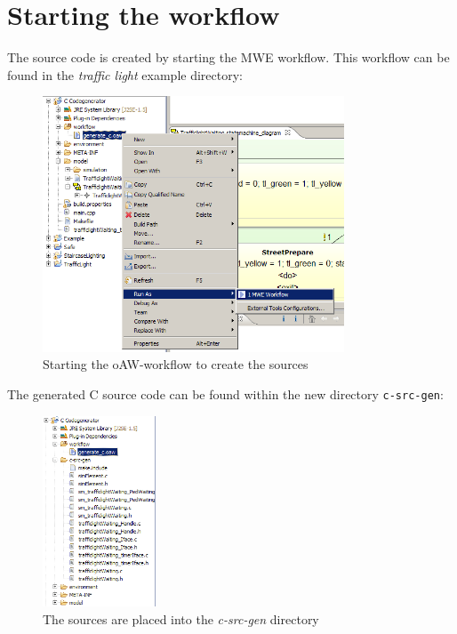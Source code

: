 
\section{Starting the workflow}

The source code is created by starting the MWE workflow. This workflow can be
found in the \textit{traffic light} example directory:

\begin{figure}[h!] \center
\includegraphics[width=0.8\textwidth]{./Pictures/workflow}
\caption{\label{fig:workflow}Starting the oAW-workflow to create the sources}
\end{figure}
\newpage

The generated C source code can be found within the new directory \texttt{c-src-gen}:

\begin{figure}[h!] \center
\includegraphics[width=0.3\textwidth]{./Pictures/sources}
\caption{\label{fig:sources}The sources are placed into the \textit{c-src-gen} directory}
\end{figure}


